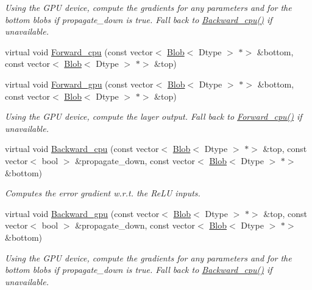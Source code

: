 \begin{DoxyCompactItemize}
\begin{DoxyCompactList}\small\item\em Using the G\+PU device, compute the gradients for any parameters and for the bottom blobs if propagate\+\_\+down is true. Fall back to \mbox{\hyperlink{classcaffe_1_1_re_l_u_layer_a4f278f1aca7a380a24b61be5429808a4}{Backward\+\_\+cpu()}} if unavailable. \end{DoxyCompactList}\item 
virtual void \mbox{\hyperlink{classcaffe_1_1_re_l_u_layer_a484e59dd846dfa3e40030bb7ce97cdbb}{Forward\+\_\+cpu}} (const vector$<$ \mbox{\hyperlink{classcaffe_1_1_blob}{Blob}}$<$ Dtype $>$ $\ast$$>$ \&bottom, const vector$<$ \mbox{\hyperlink{classcaffe_1_1_blob}{Blob}}$<$ Dtype $>$ $\ast$$>$ \&top)
\item 
\mbox{\label{classcaffe_1_1_re_l_u_layer_abaf3326b871e295c943fc0668b2f5e4e}} 
virtual void \mbox{\hyperlink{classcaffe_1_1_re_l_u_layer_abaf3326b871e295c943fc0668b2f5e4e}{Forward\+\_\+gpu}} (const vector$<$ \mbox{\hyperlink{classcaffe_1_1_blob}{Blob}}$<$ Dtype $>$ $\ast$$>$ \&bottom, const vector$<$ \mbox{\hyperlink{classcaffe_1_1_blob}{Blob}}$<$ Dtype $>$ $\ast$$>$ \&top)
\begin{DoxyCompactList}\small\item\em Using the G\+PU device, compute the layer output. Fall back to \mbox{\hyperlink{classcaffe_1_1_re_l_u_layer_ab9c29de12e2fac75843fe97f16fe14ba}{Forward\+\_\+cpu()}} if unavailable. \end{DoxyCompactList}\item 
virtual void \mbox{\hyperlink{classcaffe_1_1_re_l_u_layer_ad0ce3fca443a9d235693a7a5ae230e0d}{Backward\+\_\+cpu}} (const vector$<$ \mbox{\hyperlink{classcaffe_1_1_blob}{Blob}}$<$ Dtype $>$ $\ast$$>$ \&top, const vector$<$ bool $>$ \&propagate\+\_\+down, const vector$<$ \mbox{\hyperlink{classcaffe_1_1_blob}{Blob}}$<$ Dtype $>$ $\ast$$>$ \&bottom)
\begin{DoxyCompactList}\small\item\em Computes the error gradient w.\+r.\+t. the Re\+LU inputs. \end{DoxyCompactList}\item 
\mbox{\label{classcaffe_1_1_re_l_u_layer_a292000d3ed5d63a5a28b5a580fffc61b}} 
virtual void \mbox{\hyperlink{classcaffe_1_1_re_l_u_layer_a292000d3ed5d63a5a28b5a580fffc61b}{Backward\+\_\+gpu}} (const vector$<$ \mbox{\hyperlink{classcaffe_1_1_blob}{Blob}}$<$ Dtype $>$ $\ast$$>$ \&top, const vector$<$ bool $>$ \&propagate\+\_\+down, const vector$<$ \mbox{\hyperlink{classcaffe_1_1_blob}{Blob}}$<$ Dtype $>$ $\ast$$>$ \&bottom)
\begin{DoxyCompactList}\small\item\em Using the G\+PU device, compute the gradients for any parameters and for the bottom blobs if propagate\+\_\+down is true. Fall back to \mbox{\hyperlink{classcaffe_1_1_re_l_u_layer_a4f278f1aca7a380a24b61be5429808a4}{Backward\+\_\+cpu()}} if unavailable. \end{DoxyCompactList}\end{DoxyCompactItemize}
